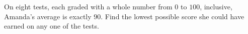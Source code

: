 On eight tests, each graded with a whole number from $0$ to $100$, inclusive, Amanda's average is exactly $90$. Find the lowest possible score she could have earned on any one of the tests.
